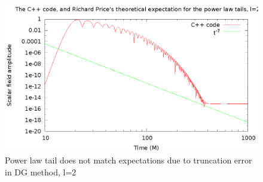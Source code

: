 \begin{figure}
  \includegraphics{l2m2tailfail2}
  \caption{Power law tail does not match expectations due to truncation error in DG method, l=2}
  \label{notaill2m2}
\end{figure}

